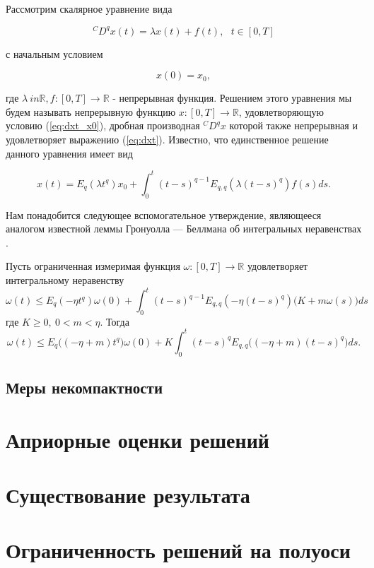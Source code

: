 Рассмотрим скалярное уравнение вида

\begin{equation}
    \label{eq:dxt}
    {}^{C}D^{q} x(t) = \lambda x(t) + f(t), \ \ \ t \in [0, T]
\end{equation}

\noindent с начальным условием

\begin{equation}
    \label{eq:dxt_x0}
    x(0) = x_{0},
\end{equation}

\noindent где $\lambda \ in \mathbb{R}, f : [0, T] \rightarrow \mathbb{R}$ - непрерывная функция. Решением этого уравнения мы
будем называть непрерывную функцию $x : [0, T] \rightarrow \mathbb{R}$, удовлетворяющую условию (\ref{eq:dxt_x0}),
дробная производная ${}^{C}D^{q}x$ которой также непрерывная и удовлетворяет выражению (\ref{eq:dxt}). Известно, что единственное
решение данного уравнения имеет вид

\begin{equation}
    x(t) = E_{q}(\lambda t^{q})x_{0} + \int_{0}^{t} (t-s)^{q-1} E_{q,q}(\lambda(t-s)^{q})f(s)ds.
\end{equation}

Нам понадобится следующее вспомогательное утверждение, являющееся аналогом известной
леммы Гронуолла — Беллмана об интегральных неравенствах \cite{kamenskii_aa}.

\begin{lemma}
    Пусть ограниченная измеримая функция $\omega: [0, T] \rightarrow \mathbb{R}$ удовлетворяет интегральному неравенству
    \begin{equation}
        \omega(t) \leq E_{q} (-\eta t^{q}) \omega(0) + \int_{0}^{t}(t-s)^{q-1} E_{q,q}(-\eta(t-s)^{q})\Big(K + m\omega(s)\Big)ds
    \end{equation}
    где $K \geq 0, \ 0 < m < \eta$. Тогда
    \begin{equation*}
        \omega(t) \leq E_{q} \Big((-\eta+m)t^{q}\Big) \omega(0) + K \int_{0}^{t} (t-s)^{q} E_{q,q} \Big((-\eta+m)(t-s)^{q}\Big)ds.
    \end{equation*}
\end{lemma}

\subsection{Меры некомпактности}

\clearpage

\section{Априорные оценки решений}

\clearpage

\section{Существование результата}

\clearpage

\section{Ограниченность решений на полуоси}

\clearpage


\nocite{*}

\printbibliography{}
